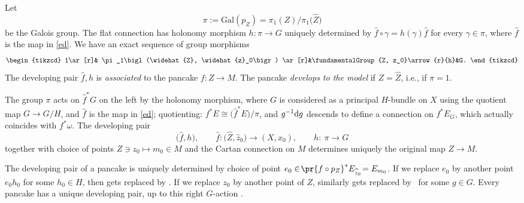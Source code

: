 Let
\[
\pi := \text{Gal}(p_Z) = \pi_1(Z)/\pi_1\bigl(\widehat Z\bigr)
\]
be the Galois group. The flat connection has holonomy morphism
$
h \colon \pi \to G
$
uniquely determined by $\widehat{f}\circ\gamma = h(\gamma)\widehat{f}$ for every $\gamma \in \pi$, where $\widehat{f}$ is the map in \eqref{ed}.
We have an exact sequence of group morphisms
\[
\begin{tikzcd}
1\ar[r]& \pi_1\bigl(\widehat{Z}, \widehat{z}_0\bigr) \ar[r]&\fundamentalGroup{Z, z_0}\arrow{r}{h}&G.
\end{tikzcd}
\]
The developing pair $\widehat{f}, h$ is \emph{associated} to the pancake $f \colon Z \to M$.
The pancake \emph{develops to the model} if $Z = \widehat{Z}$, i.e., if $\pi = 1$.

The group $\pi$ acts on $\widehat{f}^* G$ on the left by the holonomy morphism,
where $G$ is considered as a principal $H$-bundle on $X$ using the quotient map
$G \longrightarrow G/H$, and $\widehat{f}$ is the map in \eqref{ed}; quotienting: $f^*E \cong \big(\widehat{f}^*E\big)/\pi$, and $g^{-1} {\rm d}g$ descends to define a connection on $f^*E_G$, which actually coincides with $f^*\omega$. The developing pair
\[
\big(\widehat{f}, h\big), \qquad
\widehat{f} \colon \big(\widehat{Z}, \widehat{z}_0\big) \to (X, x_0),\qquad
h \colon\ \pi \to G
\]
together with choice of points $Z \ni z_0 \longmapsto m_0 \in M$ and the Cartan connection on $M$ determines uniquely
the original map $Z \to M$.

The developing pair of a pancake is uniquely determined by choice of point $e_0 \in \! \pr{f \circ p_Z} ^* E_{\widehat{z}_0}
 \!= E_{m_0}$. If we replace $e_0$ by another point $e_0 h_0$ for some $h_0 \in H$, then
 gets replaced by .
If we replace $z_0$ by another point of $Z$, similarly  gets replaced by~ for some $g \in G$.
Every pancake has a unique developing pair, up to this right $G$-action \cite[Section~2.3]{Biswas.McKay:2016}.

